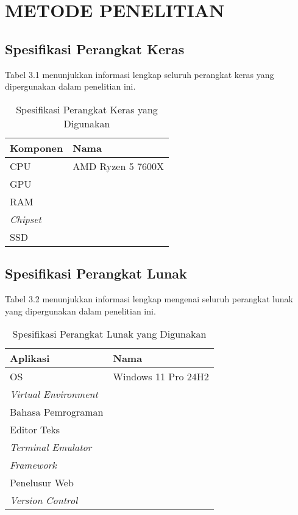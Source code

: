\chapter{METODE PENELITIAN}

\section{Spesifikasi Perangkat Keras}

Tabel 3.1 menunjukkan informasi lengkap seluruh perangkat keras yang
dipergunakan dalam penelitian ini.

\begin{table}[H]
\caption{Spesifikasi Perangkat Keras yang Digunakan}

\centering{}%
\begin{tabular}{|l|l|}
\hline 
\textbf{Komponen} & \textbf{Nama}\tabularnewline
\hline 
\hline 
CPU & AMD Ryzen 5 7600X\tabularnewline
\hline 
GPU & \tabularnewline
\hline 
RAM & \tabularnewline
\hline 
\emph{Chipset} & \tabularnewline
\hline 
SSD & \tabularnewline
\hline 
\end{tabular}
\end{table}


\section{Spesifikasi Perangkat Lunak}

Tabel 3.2 menunjukkan informasi lengkap mengenai seluruh perangkat
lunak yang dipergunakan dalam penelitian ini.

\begin{table}[H]
\caption{Spesifikasi Perangkat Lunak yang Digunakan}

\centering{}%
\begin{tabular}{|l|l|}
\hline 
\textbf{Aplikasi} & \textbf{Nama}\tabularnewline
\hline 
\hline 
OS & Windows 11 Pro 24H2\tabularnewline
\hline 
\emph{Virtual Environment} & \tabularnewline
\hline 
Bahasa Pemrograman & \tabularnewline
\hline 
Editor Teks & \tabularnewline
\hline 
\emph{Terminal Emulator} & \tabularnewline
\hline 
\emph{Framework} & \tabularnewline
\hline 
Penelusur Web & \tabularnewline
\hline 
\emph{Version Control} & \tabularnewline
\hline 
\end{tabular}
\end{table}